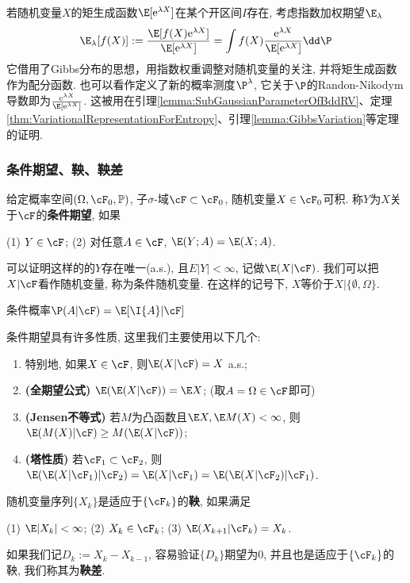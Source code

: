 \begin{example}[指数加权]
	若随机变量$X$的矩生成函数$\E[\mathrm{e}^{\lambda X}]$在某个开区间$I$存在, 考虑指数加权期望$\E_{\lambda}$
	\begin{equation*}
		\E_{\lambda} [f(X)]
		:= \frac{\E[f(X) \mathrm{e}^{\lambda X}]}{\E[\mathrm{e}^{\lambda X}]}
		= \int f(X) \frac{\mathrm{e}^{\lambda X}}{\E[\mathrm{e}^{\lambda X}]} \dd \P 
	\end{equation*}
	它借用了Gibbs分布的思想，用指数权重调整对随机变量的关注, 并将矩生成函数作为配分函数.  
	也可以看作定义了新的概率测度$\P^{\lambda}$, 它关于$\P$的Randon-Nikodym导数即为$\frac{\mathrm{e}^{\lambda X}}{\E[\mathrm{e}^{\lambda X}]}$. 
	这被用在引理\ref{lemma:SubGaussianParameterOfBddRV}、定理\ref{thm:VariationalRepresentationForEntropy}、引理\ref{lemma:GibbsVariation}等定理的证明. 
\end{example}



\subsubsection{条件期望、鞅、鞅差}

给定概率空间$(\Omega, \cF_0, \mathbb{P})$, 子$\sigma$-域$\cF \subset \cF_0$, 随机变量$X \in \cF_0$可积. 
称$Y$为$X$关于$\cF$的\textbf{条件期望}, 如果
\begin{center}
	(1) $Y \in \cF$; \quad
	(2) 对任意$A \in \cF$, $\E(Y;A) = \E(X;A)$. 
\end{center}
可以证明这样的的$Y$存在唯一(a.s.), 且$E|Y| < \infty$, 记做$\E(X|\cF)$. 
我们可以把$X | \cF$看作随机变量, 称为条件随机变量. 
在这样的记号下, $X$等价于$X | \{\emptyset, \Omega\}$. 

条件概率$\P(A | \cF) = \E[\I{A} | \cF]$

条件期望具有许多性质, 这里我们主要使用以下几个: 
	\begin{enumerate}[label=(\roman*)]
		\item 特别地, 如果$X \in \cF$, 则$\E(X|\cF) = X$ a.s.;
		\item \textbf{(全期望公式)} $\E(\E(X|\cF)) = \E X$; (取$A = \Omega \in \cF$即可)
		\item \textbf{(Jensen不等式)} 若$M$为凸函数且$\E X, \E M(X) < \infty$, 则$\E(M(X) | \cF) \geq M(\E(X|\cF))$; 
		\item \textbf{(塔性质)} 若$\cF_1 \subset \cF_2$, 则$\E(\E(X|\cF_1)|\cF_2) = \E(X|\cF_1) = \E(\E(X|\cF_2)|\cF_1)$. 
	\end{enumerate}
随机变量序列$\{X_k\}$是适应于$\{\cF_k\}$的\textbf{鞅}, 如果满足
\begin{center}
	(1) $\E |X_k| < \infty$; \quad
	(2) $X_k \in \cF_k$; \quad
	(3) $\E(X_{k+1}|\cF_k) = X_k$.
\end{center}
如果我们记$D_k := X_k - X_{k-1}$, 容易验证$\{D_k\}$期望为$0$, 并且也是适应于$\{\cF_k\}$的鞅, 我们称其为\textbf{鞅差}. 

